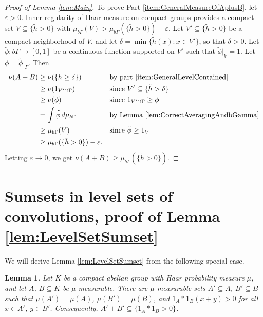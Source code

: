 \documentclass[12pt]{amsart} \usepackage{amsmath,centernot,amssymb,leftindex}
\newtheorem{lemma}[theorem]{Lemma}
\numberwithin{theorem}{section}
\numberwithin{equation}{section}
\theoremstyle{definition}
\begin{document}
\begin{proof}[Proof of Lemma \ref{lem:Main}]
To prove Part \ref{item:GeneralMeasureOfAplusB}, let $\varepsilon>0$.  Inner regularity of Haar measure on compact groups provides a compact set $V\subseteq \{\tilde{h}>0\}$ with $\mu_{b\Gamma}(V)>\mu_{b\Gamma}(\{\tilde{h}>0\})-\varepsilon$.  Let $V'\subseteq \{\tilde{h}>0\}$ be a compact neighborhood of $V$, and let $\delta=\min\{\tilde{h}(x):x\in V'\}$, so that $\delta>0$. Let $\tilde{\phi}:b\Gamma\to [0,1]$ be a continuous function supported on $V'$ such that $\tilde{\phi}|_{V}=1$.  Let $\phi=\tilde{\phi}|_{\Gamma}$. Then 
\begin{align*}
	\nu(A+B) &\geq \nu(\{h\geq \delta\}) && \text{by part \ref{item:GeneralLevelContained}}\\ &\geq \nu(1_{V'\cap \Gamma}) && \text{since $V'\subseteq \{\tilde{h}>\delta\}$}\\ &\geq \nu(\phi) && \text{since } 1_{V'\cap \Gamma} \geq \phi \\ &=\int \tilde{\phi}\, d\mu_{b\Gamma} && \text{by Lemma \ref{lem:CorrectAveragingAndbGamma}} \\ &\geq \mu_{b\Gamma}(V) && \text{since } \tilde{\phi} \geq 1_{V}
	\\&\geq \mu_{b\Gamma}(\{\tilde{h}>0\})-\varepsilon.
\end{align*} 
Letting $\varepsilon\to 0$, we get $\nu(A+B)\geq \mu_{b\Gamma}(\{\tilde{h}>0\})$. \end{proof}


















\section{Sumsets in level sets of convolutions, proof of Lemma \ref{lem:LevelSetSumset}}\label{sec:LevelSumset}
We will derive Lemma \ref{lem:LevelSetSumset} from the following special case.
\begin{lemma}\label{lem:PointsOfDensity}
	Let $K$ be a compact abelian group with Haar probability measure $\mu$, and let $A$, $B\subseteq K$ be $\mu$-measurable.  There are $\mu$-measurable sets $A' \subseteq A$, $B'\subseteq B$ such that $\mu(A')=\mu(A)$, $\mu(B')=\mu(B)$, and $1_A*1_B(x+y)>0$ for all $x\in A'$, $y\in B'$.  Consequently, $A'+B'\subseteq \{1_A*1_B>0\}$.
\end{lemma}
\end{document}
